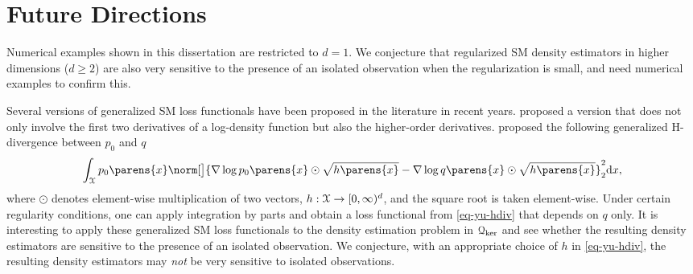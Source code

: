 \section{Future Directions}

Numerical examples shown in this dissertation are restricted to $d = 1$. We conjecture that regularized SM density estimators in higher dimensions ($d \ge 2$) are also very sensitive to the presence of an isolated observation when the regularization is small, and need numerical examples to confirm this. 


Several versions of generalized SM loss functionals have been proposed in the literature in recent years. \textcite{Parry2012-pa} proposed a version that does not only involve the first two derivatives of a log-density function but also the higher-order derivatives. \textcite{Yu2020-fb} proposed the following generalized H-divergence between $p_0$ and $q$ 
\begin{align}\label{eq-yu-hdiv}
	\int_{\calX} p_0 \parens{x} \norm[\big]{\nabla \log p_0 \parens{x} \odot \sqrt{h \parens{x}} - \nabla \log q \parens{x} \odot \sqrt{h \parens{x}} }_2^2 \diff x, 
\end{align}
where $\odot$ denotes element-wise multiplication of two vectors, $h: \mathcal{X} \to [0, \infty)^d$, and the square root is taken element-wise. Under certain regularity conditions, one can apply integration by parts and obtain a loss functional from \eqref{eq-yu-hdiv} that depends on $q$ only. It is interesting to apply these generalized SM loss functionals to the density estimation problem in $\mathcal{Q}_{\ker}$ and see whether the resulting density estimators are sensitive to the presence of an isolated observation. We conjecture, with an appropriate choice of $h$ in \eqref{eq-yu-hdiv}, the resulting density estimators may \emph{not} be very sensitive to isolated observations. 

